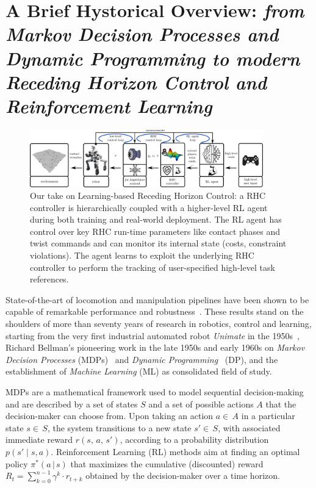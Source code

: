\section{A Brief Hystorical Overview: \textnormal{\textit{from Markov Decision Processes and Dynamic Programming to modern Receding Horizon Control and Reinforcement Learning}}}
\begin{figure}[t]
	\centering
	\vspace{0.1cm}
	\includegraphics[width=0.9\textwidth]{imgs/learning_based_rhc.pdf}
	\caption{Our take on Learning-based Receding Horizon Control: a RHC controller is hierarchically coupled with a higher-level RL agent during both training and real-world deployment. The RL agent has control over key RHC run-time parameters like contact phases and twist commands and can monitor its internal state (costs, constraint violations). The agent learns to exploit the underlying RHC controller to perform the tracking of user-specified high-level task references.}
	\label{fig:lrhc_arch}
	\vspace{-0.3cm}
\end{figure}
State-of-the-art of locomotion and manipulation pipelines have been shown to be capable of remarkable performance and robustness~\cite{rl:schneider2023learning,rl:miki2024learning,web::atlas_grip_boston_dyn,web::lrhc_boston_dyn}. These results stand on the shoulders of more than seventy years of research in robotics, control and learning, starting from the very first industrial automated robot \textit{Unimate} in the 1950s~\cite{origins:xu2018fourth}, Richard Bellman's pioneering work in the late 1950s and early 1960s on \textit{Markov Decision Processes} (MDPs)~\cite{rl:bellman1957markovian} and \textit{Dynamic Programming}~\cite{rl:bellman1960dynamic} (DP), and the establishment of \textit{Machine Learning} (ML) as consolidated field of study.

MDPs are a mathematical framework used to model sequential decision-making and are described by a set of states $S$ and a set of possible actions $A$ that the decision-maker can choose from. Upon taking an action $a\in\,A$ in a particular state $s\in\,S$, the system transitions to a new state $s'\in\,S$, with associated immediate reward $r(s,\,a,\,s')$, according to a probability distribution $p(s'\mid s, a)$. Reinforcement Learning (RL) methods aim at finding an optimal policy $\pi^{*}(a\,\vert\,s)$ that maximizes the cumulative (discounted) reward $R_t = \sum_{k=0}^{n-1} \gamma^k \cdot r_{t+k}$ obtained by the decision-maker over a time horizon.

